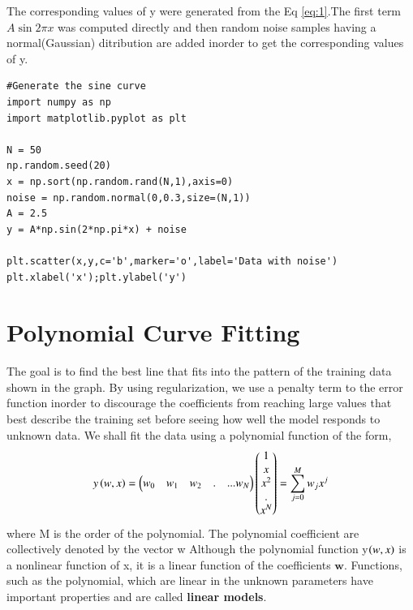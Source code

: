 \documentclass[journal,12pt,twocolumn]{IEEEtran}
\begin{document}
The corresponding values of y were generated from the Eq \eqref{eq:1}.The first term $A\sin{2\pi x}$ was computed directly and then random noise samples having a normal(Gaussian) ditribution are added inorder to get the corresponding values of y.
\begin{lstlisting}
#Generate the sine curve 
import numpy as np
import matplotlib.pyplot as plt

N = 50
np.random.seed(20)
x = np.sort(np.random.rand(N,1),axis=0)
noise = np.random.normal(0,0.3,size=(N,1))
A = 2.5
y = A*np.sin(2*np.pi*x) + noise

plt.scatter(x,y,c='b',marker='o',label='Data with noise')
plt.xlabel('x');plt.ylabel('y')
\end{lstlisting}
%
\section{Polynomial Curve Fitting}
The goal is to find the best line that fits into the  pattern of the training data shown in the graph. By using regularization, we use a penalty term to the error function inorder to discourage the coefficients from reaching large values that best describe the training set before seeing how well the model responds to unknown data.
We shall fit the data using a polynomial function of the form, 
\begin{align}
     y\left(w,x\right)= \begin{pmatrix}w_0 & w_1 & w_2 &.&...w_N\end{pmatrix}\begin{pmatrix}1 \\x\\x^2\\.\\x^N\end{pmatrix}= \sum_{j=0}^{M} w_j x^{j}
\end{align}
where M is the order of the polynomial.
The polynomial coefficient are collectively denoted by the vector w
Although the polynomial function y$\left(w,x\right)$ is a nonlinear function of x, it
is a linear function of the coefficients $\textbf{w}$. Functions, such as the polynomial, which are linear in the unknown parameters have important properties and are called \textbf{linear models}.
\end{document}
